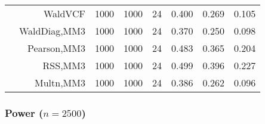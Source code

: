 \documentclass[
]{article}
\begin{document}
\begin{table}[H]
{\begin{tabular}[t]{lrrrrrrr}
\hspace{1em} & WaldVCF & 1000 & 1000 & 24 & 0.400 & 0.269 & 0.105\\

\hspace{1em} & WaldDiag,MM3 & 1000 & 1000 & 24 & 0.370 & 0.250 & 0.098\\

\hspace{1em} & Pearson,MM3 & 1000 & 1000 & 24 & 0.483 & 0.365 & 0.204\\

\hspace{1em} & RSS,MM3 & 1000 & 1000 & 24 & 0.499 & 0.396 & 0.227\\

\hspace{1em} & Multn,MM3 & 1000 & 1000 & 24 & 0.386 & 0.262 & 0.096\\
\bottomrule
\end{tabular}}
\endgroup{}
\end{table}

\subsubsection{\texorpdfstring{Power
(\(n=2500\))}{Power (n=2500)}}\label{power-n2500}
\end{document}
